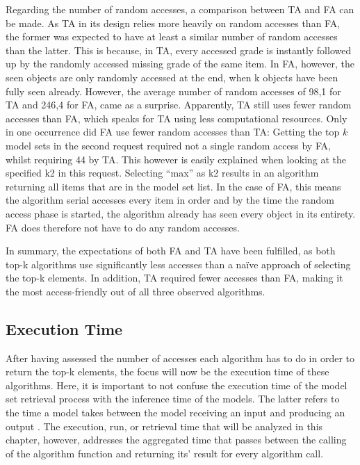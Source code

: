 Regarding the number of random accesses, a comparison between TA and FA can be made. As TA in its design relies more heavily on random accesses than FA, the former was expected to have at least a similar number of random accesses than the latter. This is because, in TA, every accessed grade is instantly followed up by the randomly accessed missing grade of the same item. In FA, however, the seen objects are only randomly accessed at the end, when k objects have been fully seen already. However, the average number of random accesses of 98,1 for TA and 246,4 for FA, came as a surprise. Apparently, TA still uses fewer random accesses than FA, which speaks for TA using less computational resources. Only in one occurrence did FA use fewer random accesses than TA: Getting the top $k$ model sets in the second request required not a single random access by FA, whilst requiring 44 by TA. This however is easily explained when looking at the specified k2 in this request. Selecting “max” as k2 results in an algorithm returning all items that are in the model set list. In the case of FA, this means the algorithm serial accesses every item in order and by the time the random access phase is started, the algorithm already has seen every object in its entirety. FA does therefore not have to do any random accesses.

In summary, the expectations of both FA and TA have been fulfilled, as both top-k algorithms use significantly less accesses than a naïve approach of selecting the top-k elements. In addition, TA required fewer accesses than FA, making it the most access-friendly out of all three observed algorithms. 



\subsection{Execution Time}

After having assessed the number of accesses each algorithm has to do in order to return the top-k elements, the focus will now be the execution time of these algorithms. Here, it is important to not confuse the execution time of the model set retrieval process with the inference time of the models. The latter refers to the time a model takes between the model receiving an input and producing an output \cite{marco2019}. The execution, run, or retrieval time that will be analyzed in this chapter, however, addresses the aggregated time that passes between the calling of the algorithm function and returning its' result for every algorithm call. 

